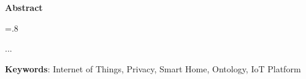 \pagestyle{empty}
\begin{latin}
\begin{center}
\textbf{Abstract}
\end{center}
\baselineskip=.8\baselineskip

...

\bigskip\noindent\textbf{Keywords}: Internet of Things, Privacy, Smart Home, Ontology, IoT Platform

\end{latin}
